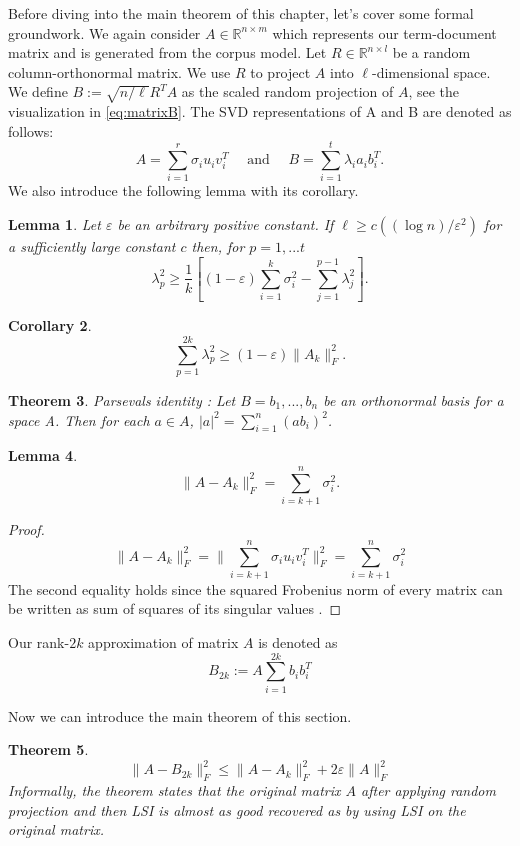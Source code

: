 \documentclass[a4paper,11pt,DIV=15]{scrartcl} %
\renewcommand{\epsilon}{\varepsilon}
\theoremstyle{plain}
\newtheorem{theorem}{Theorem}
\newtheorem{lemma}[theorem]{Lemma}
\newtheorem{corollary}[theorem]{Corollary}
\theoremstyle{definition}
\begin{document}
Before diving into the main theorem of this chapter, let's cover some formal groundwork.
We again consider $A \in \mathbb{R}^{n \times m}$ which represents our term-document matrix and is generated from the corpus model. Let $R \in \mathbb{R}^{n \times l} $ be a random column-orthonormal matrix. We use $R$ to project $A$ into $\ell$-dimensional space. We define $B:= \sqrt{n/\ell}R^TA$ as the scaled random projection of $A$, see the visualization in \ref{eq:matrixB}.
The SVD representations of A and B are denoted as follows:
\[
A = \sum_{i=1}^r \sigma_i u_i v_i^T \,\,\,\,\,\,\,\,\text{and}\,\,\,\,\,\,\,\, B=\sum_{i=1}^t \lambda_i a_i b_i^T.
\]
We also introduce the following lemma with its corollary.
\begin{lemma}
Let $\epsilon$ be an arbitrary positive constant. If $\ell \geq c((\log n)/\epsilon^2)$ for a sufficiently large constant $c$ then, for  $p =1,...t$
\[
\lambda_p^2 \geq \dfrac{1}{k} [(1-\epsilon) \sum_{i=1}^k \sigma_i^2 - \sum_{j=1}^{p-1} \lambda_j^2].
\]
\end{lemma}
\begin{corollary}
\[
\sum_{p=1}^{2k} \lambda_p^2 \geq (1-\epsilon) \lVert A_k \rVert_F^2.
\]
\end{corollary}
\begin{theorem}
    Parsevals identity \cite{hogben2013handbook}:
    Let $B = {b_1,...,b_n}$ be an orthonormal basis for a space A. Then for each $a \in A$, $|a|^2 = \sum_{i=1}^n (ab_i)^2$.
\end{theorem}
\begin{lemma}
\label{lem:A_Ak}
\[
\lVert A - A_k \rVert_F^2  = \sum_{i=k+1}^n \sigma_i^2. 
\]
\end{lemma} 
\begin{proof}
\[
\lVert A - A_k \rVert_F^2 = \lVert \sum_{i=k+1}^n \sigma_i u_i v_i^T \rVert_F^2  = \sum_{i=k+1}^n \sigma_i^2 
\]
The second equality holds since the squared Frobenius norm of every matrix can be written as sum of squares of its singular values \cite{FrobeniusDef}.
    
\end{proof}


Our rank-$2k$ approximation of matrix $A$ is denoted as
\[
B_{2k} := A \sum_{i=1}^{2k} b_ib_i^T
\]

Now we can introduce the main theorem of this section.
\begin{theorem}
\[
    \lVert A - B_{2k} \rVert_F^2 \leq \lVert A - A_k \rVert_F^2 + 2\epsilon\lVert A \rVert_F^2
\]
Informally, the theorem states that the original matrix $A$ after applying random projection and then LSI is almost as good recovered as by using LSI on the original matrix.
\end{theorem}
\end{document}

